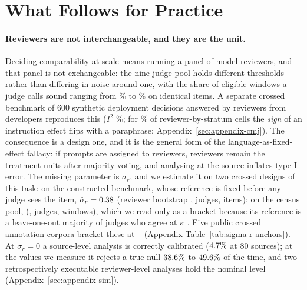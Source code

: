 \documentclass[11pt]{article}
\begin{document}
\section{What Follows for Practice}
\label{sec:practice}

\paragraph{Reviewers are not interchangeable, and they are the unit.}
Deciding comparability at scale means running a panel of model reviewers, and
that panel is not exchangeable: the nine-judge pool holds different thresholds
rather than differing in noise around one, with the share of eligible windows a
judge calls sound ranging from \TierSurvivesLo\% to \TierSurvivesHi\% on
identical items. A separate crossed
benchmark of 600 synthetic deployment decisions answered by \CMJmodels{}
reviewers from \CMJdevelopers{} developers reproduces this ($I^2$ \CMJCtwoIsq\%;
for \CMJSignBelowHalf\% of reviewer-by-stratum cells the \emph{sign} of an
instruction effect flips with a paraphrase; Appendix~\ref{sec:appendix-cmj}).
The consequence is a design one, and it is the general form of the
language-as-fixed-effect fallacy: if prompts are assigned to reviewers,
reviewers remain the treatment units after majority voting, and analysing at the
source inflates type-I error. The missing parameter is $\sigma_r$, and we
estimate it on two crossed designs of this task: on the constructed benchmark,
whose reference is fixed before any judge sees the item,
$\hat\sigma_r=0.38{}$ (reviewer bootstrap \SigInsCI{}, \SigInsRev{}
judges, \SigInsItems{} items); on the census pool, \SigCensusVal{}
(\SigCensusCI{}, \SigCensusRev{} judges, \SigCensusItems{} windows), which we
read only as a bracket because its reference is a leave-one-out majority of
judges who agree at $\kappa$ \DecVerdictK{}. Five public crossed annotation
corpora bracket these at \SigmaMin{}--\SigmaMax{} (Appendix
Table~\ref{tab:sigma-r-anchors}). At $\sigma_r=0$ a source-level analysis is
correctly calibrated ($4.7\%$ at 80 sources); at the values we measure it
rejects a true null $38.6\%$ to $49.6\%$ of the time, and two
retrospectively executable reviewer-level analyses hold the nominal level
(Appendix~\ref{sec:appendix-sim}).
\end{document}
